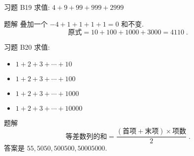 \documentclass[content.tex]{subfiles}
\begin{document}
\begin{frame}{习题 B19}
求值: $4+9+99+999+2999$
\begin{exampleblock}{题解}
叠加一个 $-4+1+1+1+1=0$ 和不变.
$$\text{原式} = 10+100+1000+3000=4110\;.$$
\end{exampleblock}
\end{frame}

\begin{frame}{习题 B20}
求值:
\begin{itemize}
\item $1+2+3+ \cdots +10$
\item $1+2+3+ \cdots +100$
\item $1+2+3+ \cdots +1000$
\item $1+2+3+ \cdots +10000$
\end{itemize}
\begin{exampleblock}{题解}
$$\text{等差数列的和} = 
\frac{(\text{首项} + \text{末项})\times \text{项数}}{2}\;.$$ 
答案是 $55, 5050, 500500, 50005000$.
\end{exampleblock}
\end{frame}
\end{document}
